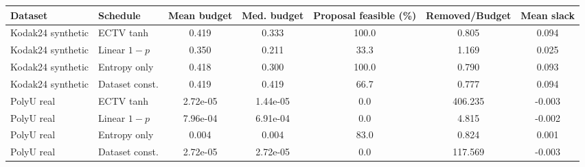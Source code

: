 \begin{tabular}{llccccc}
\toprule
Dataset & Schedule & Mean budget & Med. budget & Proposal feasible (\%) & Removed/Budget & Mean slack \\
\midrule
Kodak24 synthetic & ECTV tanh & 0.419 & 0.333 & 100.0 & 0.805 & 0.094 \\
Kodak24 synthetic & Linear $1-p$ & 0.350 & 0.211 & 33.3 & 1.169 & 0.025 \\
Kodak24 synthetic & Entropy only & 0.418 & 0.300 & 100.0 & 0.790 & 0.093 \\
Kodak24 synthetic & Dataset const. & 0.419 & 0.419 & 66.7 & 0.777 & 0.094 \\
PolyU real & ECTV tanh & 2.72e-05 & 1.44e-05 & 0.0 & 406.235 & -0.003 \\
PolyU real & Linear $1-p$ & 7.96e-04 & 6.91e-04 & 0.0 & 4.815 & -0.002 \\
PolyU real & Entropy only & 0.004 & 0.004 & 83.0 & 0.824 & 0.001 \\
PolyU real & Dataset const. & 2.72e-05 & 2.72e-05 & 0.0 & 117.569 & -0.003 \\
\bottomrule
\end{tabular}
